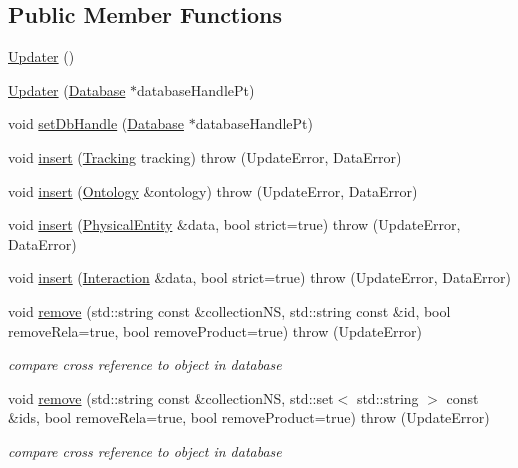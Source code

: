 \subsection*{Public Member Functions}
\begin{DoxyCompactItemize}
\item 
\hyperlink{classunisys_1_1Updater_ab0079f44f1add44d18692c2f87c3f1e6}{Updater} ()
\item 
\hyperlink{classunisys_1_1Updater_aeaa204ad3c2cfc686ec0c3a3d57fdbf3}{Updater} (\hyperlink{classunisys_1_1Database}{Database} $\ast$database\-Handle\-Pt)
\item 
void \hyperlink{classunisys_1_1Updater_aae02dfd6f04722346226e547afc85ed7}{set\-Db\-Handle} (\hyperlink{classunisys_1_1Database}{Database} $\ast$database\-Handle\-Pt)
\item 
void \hyperlink{classunisys_1_1Updater_ad8033c6fbe0e45b1742f2d9ce428b6d1}{insert} (\hyperlink{classunisys_1_1Tracking}{Tracking} tracking)  throw (\-Update\-Error, Data\-Error)
\item 
void \hyperlink{classunisys_1_1Updater_a5380b25675232f85a7a21eb2b17e1732}{insert} (\hyperlink{classunisys_1_1Ontology}{Ontology} \&ontology)  throw (\-Update\-Error, Data\-Error)
\item 
void \hyperlink{classunisys_1_1Updater_a285cdbf9ff2a5aae97e606ef70781e9e}{insert} (\hyperlink{classunisys_1_1PhysicalEntity}{Physical\-Entity} \&data, bool strict=true)  throw (\-Update\-Error, Data\-Error)
\item 
void \hyperlink{classunisys_1_1Updater_ac8e83863cb9ee8d775f7c5394cb469af}{insert} (\hyperlink{classunisys_1_1Interaction}{Interaction} \&data, bool strict=true)  throw (\-Update\-Error, Data\-Error)
\item 
void \hyperlink{classunisys_1_1Updater_a640ab1f4cdfcb9b0d1d30039fb8eb217}{remove} (std\-::string const \&collection\-N\-S, std\-::string const \&id, bool remove\-Rela=true, bool remove\-Product=true)  throw (\-Update\-Error)
\begin{DoxyCompactList}\small\item\em compare cross reference to object in database \end{DoxyCompactList}\item 
void \hyperlink{classunisys_1_1Updater_a1e0a275963366933893bd91f1ee1edf9}{remove} (std\-::string const \&collection\-N\-S, std\-::set$<$ std\-::string $>$ const \&ids, bool remove\-Rela=true, bool remove\-Product=true)  throw (\-Update\-Error)
\begin{DoxyCompactList}\small\item\em compare cross reference to object in database \end{DoxyCompactList}\item 

\end{DoxyCompactItemize}
